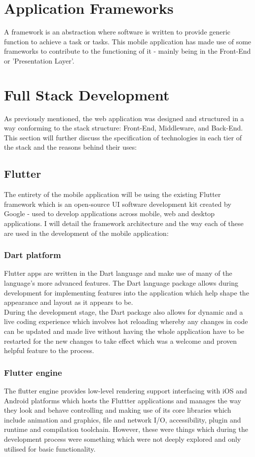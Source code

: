 \documentclass{report}
\begin{document}
	\section{Application Frameworks}
A framework is an abstraction where software is written to provide generic function to achieve a task or tasks. This mobile application has made use of some frameworks to contribute to the functioning of it - mainly being in the Front-End or 'Presentation Layer'.

	\section{Full Stack Development}
As previously mentioned, the web application was designed and structured in a way conforming to the stack structure: Front-End, Middleware, and Back-End. This section will further discuss the specification of technologies in each tier of the stack and the reasons behind their uses: 

		\subsection{Flutter}
The entirety of the mobile application will be using the existing Flutter framework which is an open-source UI software development kit created by Google - used to develop applications across mobile, web and desktop applications. I will detail the framework architecture and the way each of these are used in the development of the mobile application: 

		\subsubsection{Dart platform}
Flutter apps are written in the Dart language and make use of many of the language's more advanced features. The Dart language package allows during development for implementing features into the application which help shape the appearance and layout as it appears to be.\\

During the development stage, the Dart package also allows for dynamic and a live coding experience which involves hot reloading whereby any changes in code can be updated and made live without having the whole application have to be restarted for the new changes to take effect which was a welcome and proven helpful feature to the process.

		\subsubsection{Flutter engine}
The flutter engine provides low-level rendering support interfacing with iOS and Android platforms which hosts the Fluttter applications and manages the way they look and behave controlling and making use of its core libraries which include animation and graphics, file and network I/O, accessibility, plugin and runtime and compilation toolchain. However, these were things which during the development process were something which were not deeply explored and only utilised for basic functionality.\\
\end{document}
